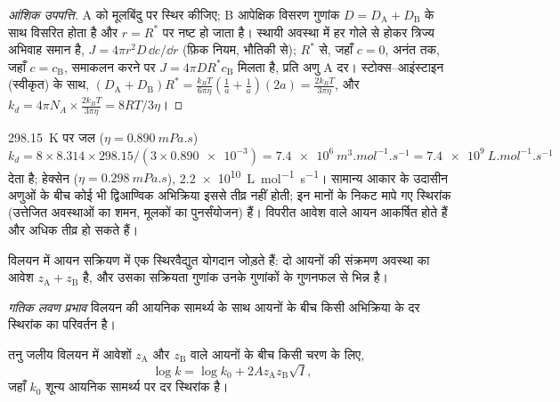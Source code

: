 \begin{proof}[आंशिक उपपत्ति]
A को मूलबिंदु पर स्थिर कीजिए; B आपेक्षिक विसरण गुणांक $D =
D_{\mathrm A} + D_{\mathrm B}$ के साथ विसरित होता है और $r = R^*$ पर नष्ट हो जाता है। स्थायी अवस्था में
हर गोले से होकर त्रिज्य अभिवाह समान है, $J = 4\pi r^2D\,\dd c/\dd r$ (फ़िक नियम,
भौतिकी से); $R^*$ से, जहाँ $c = 0$, अनंत तक, जहाँ $c = c_{\mathrm B}$, समाकलन करने पर
$J = 4\pi DR^*c_{\mathrm B}$ मिलता है, प्रति अणु A दर। स्टोक्स--आइंस्टाइन (स्वीकृत) के साथ,
$(D_{\mathrm A} + D_{\mathrm B})R^* = \frac{k_BT}{6\pi\eta}(\frac{1}{a} + \frac1a)(2a) = \frac{2k_BT}{3\pi\eta}$, और $k_d = 4\pi N_A \times
\frac{2k_BT}{3\pi\eta} = 8RT/3\eta$।
\end{proof}

\begin{example}[जल और हेक्सेन में गति-सीमाएँ]\label{ex:b3:rate-theories:speed-limit}
\qty{298.15}{K} पर जल ($\eta = \qty{0.890}{mPa.s}$) $k_d = 8 \times 8.314 \times
298.15/(3 \times \num{0.890e-3}) = \qty{7.4e6}{m^3.mol^{-1}.s^{-1}} = \qty{7.4e9}{L.mol^{-1}.s^{-1}}$ देता है; हेक्सेन
($\eta = \qty{0.298}{mPa.s}$), \qty{2.2e10}{L.mol^{-1}.s^{-1}}। सामान्य आकार के उदासीन अणुओं के बीच कोई भी
द्विआण्विक अभिक्रिया इससे तीव्र नहीं होती; इन मानों के निकट मापे गए स्थिरांक
(उत्तेजित अवस्थाओं का शमन, मूलकों का पुनर्संयोजन)
 हैं। विपरीत आवेश वाले आयन आकर्षित होते हैं और अधिक तीव्र हो सकते हैं।
\end{example}

विलयन में आयन सक्रियण में एक स्थिरवैद्युत योगदान जोड़ते हैं: दो आयनों की
संक्रमण अवस्था का आवेश $z_{\mathrm A} + z_{\mathrm B}$ है, और उसका सक्रियता गुणांक
उनके गुणांकों के गुणनफल से भिन्न है।

\begin{definition}[गतिक लवण प्रभाव]\label{def:b3:rate-theories:salt}
\emph{गतिक लवण प्रभाव} विलयन की आयनिक सामर्थ्य के साथ
आयनों के बीच किसी अभिक्रिया के दर स्थिरांक का परिवर्तन है।
\end{definition}

\begin{proposition}[ब्रॉन्स्टेड--ब्येरुम समीकरण]\label{prop:b3:rate-theories:bronsted-bjerrum}
तनु जलीय विलयन में आवेशों $z_{\mathrm A}$ और $z_{\mathrm B}$ वाले आयनों के बीच किसी चरण के लिए,
\[
  \log k = \log k_0 + 2Az_{\mathrm A}z_{\mathrm B}\sqrt I,
\]
जहाँ $k_0$ शून्य आयनिक सामर्थ्य पर दर स्थिरांक है।
\end{proposition}

